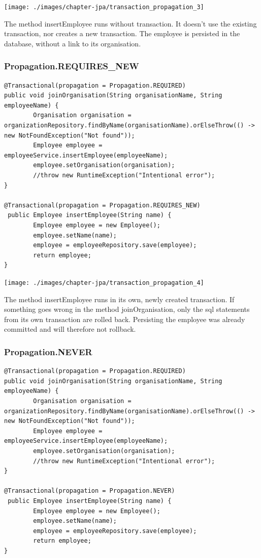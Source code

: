 \texttt{[image: ./images/chapter-jpa/transaction\_propagation\_3]}

The method insertEmployee runs without transaction. It doesn't use the existing transaction, nor creates a new transaction. The employee is persisted in the database, without a link to its organisation.

\subsubsection{Propagation.REQUIRES\_NEW}

\begin{lstlisting}
@Transactional(propagation = Propagation.REQUIRED)
public void joinOrganisation(String organisationName, String employeeName) {
        Organisation organisation = organizationRepository.findByName(organisationName).orElseThrow(() -> new NotFoundException("Not found"));
        Employee employee = employeeService.insertEmployee(employeeName);
        employee.setOrganisation(organisation);
        //throw new RuntimeException("Intentional error");
}

@Transactional(propagation = Propagation.REQUIRES_NEW)
 public Employee insertEmployee(String name) {
        Employee employee = new Employee();
        employee.setName(name);
        employee = employeeRepository.save(employee);
        return employee;
}
\end{lstlisting}

\texttt{[image: ./images/chapter-jpa/transaction\_propagation\_4]}

The method insertEmployee runs in its own, newly created transaction. If something goes wrong in the method joinOrganisation, only the sql statements from its own transaction are rolled back. Persisting the employee was already committed and will therefore not rollback.

\subsubsection{Propagation.NEVER}

\begin{lstlisting}
@Transactional(propagation = Propagation.REQUIRED)
public void joinOrganisation(String organisationName, String employeeName) {
        Organisation organisation = organizationRepository.findByName(organisationName).orElseThrow(() -> new NotFoundException("Not found"));
        Employee employee = employeeService.insertEmployee(employeeName);
        employee.setOrganisation(organisation);
        //throw new RuntimeException("Intentional error");
}

@Transactional(propagation = Propagation.NEVER)
 public Employee insertEmployee(String name) {
        Employee employee = new Employee();
        employee.setName(name);
        employee = employeeRepository.save(employee);
        return employee;
}
\end{lstlisting}

